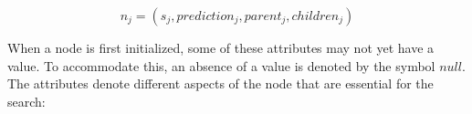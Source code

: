 
\begin{equation}
    \label{e_search_tree_simple}
    n_j = (s_j, prediction_j, parent_j, children_j)
\end{equation}

When a node is first initialized, some of these attributes may not yet have a value. To accommodate this, an absence of a value is denoted by the symbol $null$. The attributes denote different aspects of the node that are essential for the search:


